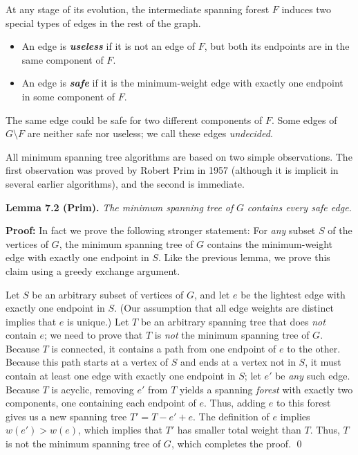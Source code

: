 At any stage of its evolution, the intermediate spanning forest $F$ induces two special types of edges in the rest of the graph.

\begin{itemize}
\item An edge is \textbf{\textit{useless}} if it is not an edge of $F$, but both its endpoints are in the same component of $F$.
\item An edge is \textbf{\textit{safe}} if it is the minimum-weight edge with exactly one endpoint in some component of $F$.
\end{itemize}

The same edge could be safe for two different components of $F$. Some edges of $G \setminus F$ are neither safe nor useless; we call these edges \textit{undecided}.

All minimum spanning tree algorithms are based on two simple observations. The first observation was proved by Robert Prim in 1957 (although it is implicit in several earlier algorithms), and the second is immediate.

\noindent\textbf{Lemma 7.2 (Prim).} \textsl{The minimum spanning tree of} $G$ \textsl{contains every safe edge.}

\medskip
\noindent\textbf{Proof:} In fact we prove the following stronger statement: For \textit{any} subset $S$ of the vertices of $G$, the minimum spanning tree of $G$ contains the minimum-weight edge with exactly one endpoint in $S$. Like the previous lemma, we prove this claim using a greedy exchange argument.

Let $S$ be an arbitrary subset of vertices of $G$, and let $e$ be the lightest edge with exactly one endpoint in $S$. (Our assumption that all edge weights are distinct implies that $e$ is unique.) Let $T$ be an arbitrary spanning tree that does \textit{not} contain $e$; we need to prove that $T$ is \textit{not} the minimum spanning tree of $G$. Because $T$ is connected, it contains a path from one endpoint of $e$ to the other. Because this path starts at a vertex of $S$ and ends at a vertex not in $S$, it must contain at least one edge with exactly one endpoint in $S$; let $e'$ be \textit{any} such edge. Because $T$ is acyclic, removing $e'$ from $T$ yields a spanning \textit{forest} with exactly two components, one containing each endpoint of $e$. Thus, adding $e$ to this forest gives us a new spanning tree $T'= T-e'+ e$. The definition of $e$ implies $w(e') >w(e)$, which implies that $T'$ has smaller total weight than $T$. Thus, $T$ is not the minimum spanning tree of $G$, which completes the proof. \qed

